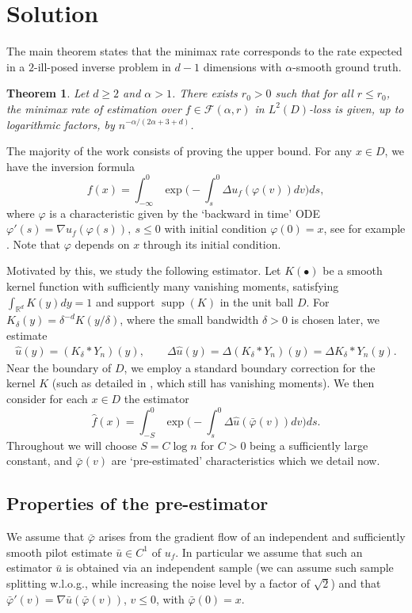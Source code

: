 \documentclass{article}
\numberwithin{equation}{section}
\newtheorem{theorem}[satz]{Theorem}
\theoremstyle{definition}
\DeclareMathOperator{\R}{{\mathbb R}}
\renewcommand{\phi}{\varphi}
\renewcommand{\cdot}{{\scriptstyle \bullet} }
\renewcommand{\le}{\leqslant}
\renewcommand{\ge}{\geqslant}
\begin{document}
\section{Solution}
The main theorem states that the minimax rate corresponds to the rate expected in a $2$-ill-posed inverse problem in $d-1$ dimensions with $\alpha$-smooth ground truth.
\begin{mdframed}
\begin{theorem} Let $d\ge 2$ and $\alpha>1$. There exists $r_0>0$ such that for all $r\le r_0$, the minimax rate of estimation over $f\in \mathcal F(\alpha,r)$ in $L^2(D)$-loss is given, up to logarithmic factors, by $n^{-\alpha/(2\alpha+3+d)}$.
\end{theorem}
\end{mdframed}


The majority of the work consists of proving the upper bound. For any $x\in D$, we have the inversion formula 
\[f(x) = \int_{-\infty}^0 \exp\Big(-\int_s^0 \Delta u_f(\varphi(v))dv \Big) ds, \]
where $\varphi$ is a characteristic given by the `backward in time' ODE $\varphi'(s)=\nabla u_f(\varphi(s)),~s\le 0$ with initial condition $\varphi(0)=x$, see for example \cite{richter1981inverse}. Note that $\phi$ depends on $x$ through its initial condition.

Motivated by this, we study the following estimator. Let $K(\cdot)$ be a smooth kernel function with sufficiently many vanishing moments, satisfying $\int_{\R^d} K(y)dy =1$ and  support $\operatorname{supp}(K)$ in the  unit ball $D$. For $K_\delta(y)=\delta^{-d}K(y/\delta)$, where the small bandwidth $\delta>0$ is chosen later, we estimate
\begin{align*} 
\hat u(y)=(K_\delta\ast Y_n)(y),\qquad 
\Delta \hat u(y)=\Delta(K_\delta\ast Y_n)(y)=\Delta K_\delta\ast Y_n (y).
\end{align*}
Near the boundary of $D$, we employ a standard boundary correction for the kernel $K$ (such as detailed in \cite{MullerStadtmuller1999}, which still has vanishing moments). We then consider for each $x\in D$ the estimator
\[\hat f(x) = \int_{-S}^0 \exp\Big(-\int_s^0 \Delta \hat u(\bar{\varphi}(v))dv  \Big) ds. \]
Throughout we will choose $S=C\log n $ for $C>0$ being a sufficiently large constant, and  $\bar{\varphi}(v)$ are `pre-estimated' characteristics which we detail now.

\subsection{Properties of the pre-estimator}
We assume that $\bar{\varphi}$ arises from the gradient flow of an independent and sufficiently smooth pilot estimate $\bar u\in C^1$ of $u_f$. In particular we assume that such an estimator $\bar u$ is obtained via an independent sample (we can assume such sample splitting w.l.o.g., while increasing the noise level by a factor of $\sqrt 2$) and that $\bar{\varphi}'(v)= \nabla \bar u(\bar{\varphi}(v))$, $v\le 0$, with $\bar\phi(0)=x$.
\end{document}
